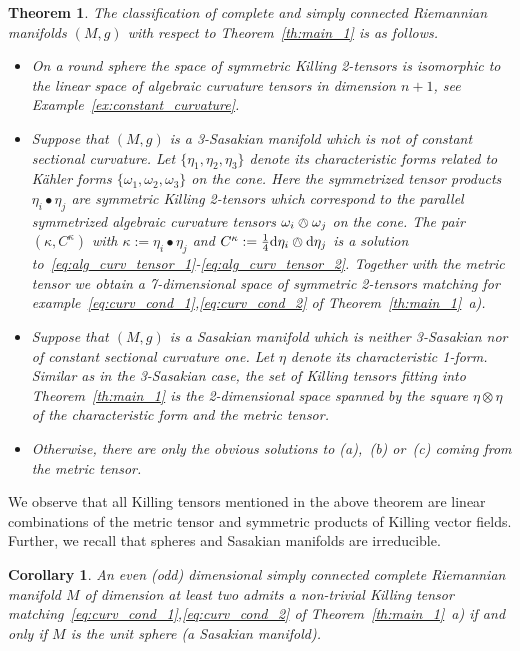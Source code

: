 \documentclass[11pt,a4paper]{article}
\theoremstyle{plain}
\newtheorem{theorem}{Theorem}
\newtheorem{corollary}{Corollary}
\theoremstyle{remark}
\renewcommand{\d}{\mathrm{d}}
\begin{document}
\bigskip
\begin{theorem}\label{th:main_2}
The classification of complete and simply connected Riemannian manifolds $(M,g)$ with respect to Theorem~\ref{th:main_1} is as follows.
\begin{itemize}
\item On a round sphere the space of symmetric Killing
  2-tensors is isomorphic to the linear space of algebraic curvature tensors
  in dimension $n+1$, see Example~\ref{ex:constant_curvature}.
\item  Suppose that $(M,g)$ is a 3-Sasakian manifold which is not of constant sectional curvature. 
Let $\{\eta_1,\eta_2,\eta_3\}$ denote its characteristic forms related to Kähler forms $\{\omega_1,\omega_2,\omega_3\}$ 
on the cone. Here the symmetrized tensor products $\eta_i\bullet\eta_j$ are symmetric Killing 2-tensors which correspond to 
the parallel symmetrized algebraic curvature tensors $\omega_i\owedge\omega_j$ on the cone. 
The pair $(\kappa,C^\kappa)$ with $\kappa := \eta_i\bullet\eta_j$ and $C^\kappa := \frac{1}{4} \d\eta_i\owedge\d\eta_j$ is a solution to~\eqref{eq:alg_curv_tensor_1}-\eqref{eq:alg_curv_tensor_2}. Together with the metric tensor we obtain a 7-dimensional space of symmetric 2-tensors matching for example~\eqref{eq:curv_cond_1},\eqref{eq:curv_cond_2} of Theorem~\ref{th:main_1}~a).
\item Suppose that $(M,g)$ is a Sasakian manifold  which is neither 3-Sasakian
  nor of constant sectional curvature one. Let $\eta$ denote its
  characteristic 1-form. Similar as in the 3-Sasakian case, the set of Killing
  tensors fitting into Theorem~\ref{th:main_1} is the 2-dimensional space spanned by the square $\eta \otimes \eta $ of the characteristic form and the metric tensor. 
\item Otherwise, there are only the obvious solutions to (a),~(b) or~(c)
  coming from the metric tensor.
\end{itemize}
\end{theorem}

We observe that all Killing tensors mentioned in the above theorem are  linear combinations of the metric tensor and symmetric products of Killing vector fields. 
Further, we recall that spheres and Sasakian manifolds are irreducible.

\bigskip
\begin{corollary}\label{co:main_1}
An even (odd) dimensional simply connected complete Riemannian manifold $M$ of
dimension at least two admits a non-trivial Killing tensor matching~\eqref{eq:curv_cond_1},\eqref{eq:curv_cond_2} of Theorem~\ref{th:main_1}~a) if and only if $M$ is the unit sphere (a Sasakian manifold).
\end{corollary}
\end{document}
